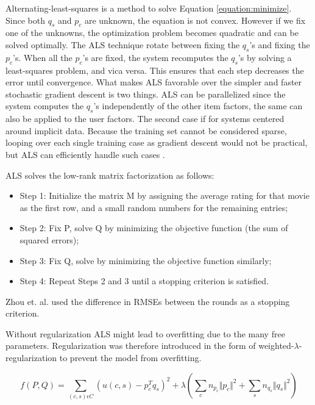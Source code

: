 Alternating-least-squares is a method to solve Equation \ref{equation:minimize}. Since both $q_{s}$ and $p_{c}$ are unknown, the equation is not convex. However if we fix one of the unknowns, the optimization problem becomes quadratic and can be solved optimally. The ALS technique rotate between fixing the $q_{s}$'s and fixing the $p_{c}$'s. When all the $p_{c}$'s are fixed, the system recomputes the $q_{s}$'s by solving a least-squares problem, and vica versa. This ensures that each step decreases the error until convergence. What makes ALS favorable over the simpler and faster stochastic gradient descent is two things. ALS can be parallelized since the system computes the $q_{s}$'s independently of the other item factors, the same can also be applied to the user factors. The second case if for systems centered around implicit data. Because the training set cannot be considered sparse, looping over each single training case as gradient descent would not be practical, but ALS can efficiently handle such cases \cite{Hu2008}.

ALS solves the low-rank matrix factorization as follows:

\begin{itemize}
\item Step 1: Initialize the matrix M by assigning the average rating for that movie as the first row, and a small random numbers for the remaining entries;
\item Step 2: Fix P, solve Q by minimizing the objective function (the sum of squared errors);
\item Step 3: Fix Q, solve by minimizing the objective function similarly;
\item Step 4: Repeat Steps 2 and 3 until a stopping criterion is satisfied.
\end{itemize}

Zhou et. al. \cite{Zhou2008} used the difference in RMSEs between the rounds as a stopping criterion.

Without regularization ALS might lead to overfitting due to the many free parameters. Regularization was therefore introduced in the form of weighted-$\lambda$-regularization to prevent the model from overfitting.

\begin{equation}
f(P, Q) = \sum_{(c,s)\epsilon C} (u(c,s) - p^{T}_{c}q_{s})^{2} + \lambda (\sum_{c} n_{p_{c}} \Vert p_{c} \Vert ^{2} + \sum_{s} n_{q_{s}} \Vert q_{s} \Vert ^{2})
\label{WeightedLamba}
\end{equation}

